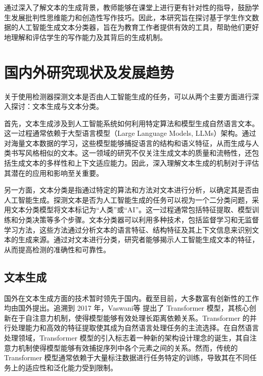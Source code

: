 通过深入了解文本的生成背景，教师能够在课堂上进行更有针对性的指导，鼓励学生发展批判性思维能力和创造性写作技巧。因此，本研究旨在探讨基于学生作文数据的人工智能生成文本分类器，旨在为教育工作者提供有效的工具，帮助他们更好地理解和评估学生的写作能力及其背后的生成机制。

\section{国内外研究现状及发展趋势}
\label{sec:intro-inout}

关于使用检测器探测文本是否由人工智能生成的任务，可以从两个主要方面进行深入探讨：文本生成与文本分类。

首先，文本生成涉及到人工智能系统如何利用特定算法和模型生成自然语言文本。这一过程通常依赖于大型语言模型（Large Language Models, LLMs）架构。通过对海量文本数据的学习，这些模型能够捕捉语言的结构和语义特征，从而生成与人类书写风格相似的文本。这一领域的研究不仅关注生成文本的质量和流畅性，还包括生成文本的多样性和上下文适应能力。因此，深入理解文本生成的机制对于评估其潜在的应用和影响至关重要。

另一方面，文本分类是指通过特定的算法和方法对文本进行分析，以确定其是否由人工智能生成。探测文本是否为人工智能生成的任务可以视为一个二分类问题，采用文本分类模型将文本标记为“人类”或“AI”。这一过程通常包括特征提取、模型训练和分类决策等多个步骤。文本分类器可以利用多种技术，包括监督学习和无监督学习方法，这些方法通过分析文本的语言特征、结构特征及其上下文信息来识别文本的生成来源。通过对文本进行分类，研究者能够揭示人工智能生成文本的特征，从而提高检测的准确性和可靠性。

\subsection{文本生成}
\label{sec:intro-inout-textgenerate}

国外在文本生成方面的技术暂时领先于国内。截至目前，大多数富有创新性的工作均由国外提出。追溯到 2017 年，Vaswani等 \cite{transformer} 提出了 Transformer 模型，其核心创新在于自注意力机制，使得模型能够有效处理长距离依赖关系。Transformer 的并行处理能力和高效的特征提取使其成为自然语言处理任务的主流选择。在自然语言处理领域，Transformer 模型的引入标志着一种新的架构设计理念的诞生，其自注意力机制使得模型能够有效捕捉序列中各个元素之间的关系。然而，传统的 Transformer 模型通常依赖于大量标注数据进行任务特定的训练，导致其在不同任务上的适应性和泛化能力受到限制。

